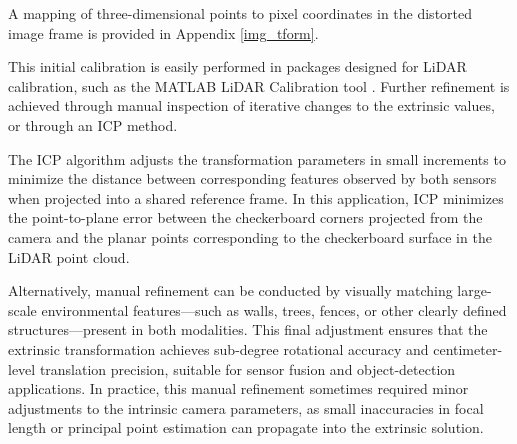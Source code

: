 \documentclass{erauthesis}
\begin{document}
A mapping of three-dimensional points to pixel coordinates in the distorted image frame is provided in Appendix \ref{img_tform}.

This initial calibration is easily performed in packages designed for LiDAR calibration, such as the MATLAB LiDAR Calibration tool \cite{matlab_calibration}.
Further refinement is achieved through manual inspection of iterative changes to the extrinsic values, or through an \ac{ICP} method.

The \ac{ICP} algorithm adjusts the transformation parameters in small increments to minimize the distance between corresponding features observed by both sensors when projected into a shared reference frame.
In this application, ICP minimizes the point-to-plane error between the checkerboard corners projected from the camera and the planar points corresponding to the checkerboard surface in the LiDAR point cloud.

Alternatively, manual refinement can be conducted by visually matching large-scale environmental features—such as walls, trees, fences, or other clearly defined structures—present in both modalities.  
This final adjustment ensures that the extrinsic transformation achieves sub-degree rotational accuracy and centimeter-level translation precision, suitable for sensor fusion and object-detection applications.
In practice, this manual refinement sometimes required minor adjustments to the intrinsic camera parameters, as small inaccuracies in focal length or principal point estimation can propagate into the extrinsic solution.



\end{document}
